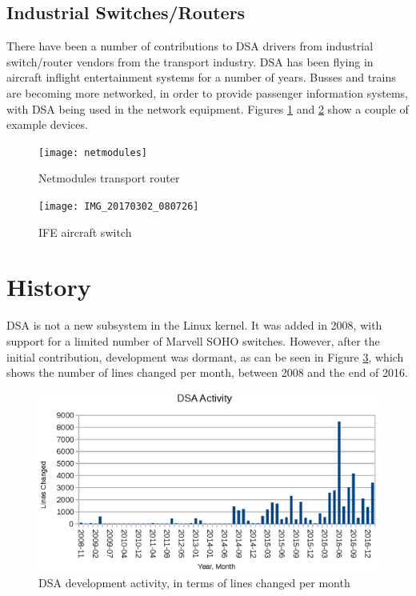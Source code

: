 \documentclass[letterpaper]{article}
\begin{document}
\subsection{Industrial Switches/Routers}

There have been a number of contributions to DSA drivers from
industrial switch/router vendors from the transport industry. DSA has
been flying in aircraft inflight entertainment systems for a number of
years. Busses and trains are becoming more networked, in order to
provide passenger information systems, with DSA being used in the
network equipment. Figures \ref{netmodules} and \ref{ife} show a
couple of example devices.

\begin{figure}[ht]
  \centering
  \texttt{[image: netmodules]}
  \caption{Netmodules transport router}
  \label{netmodules}
\end{figure}

\begin{figure}[ht]
  \centering
  \texttt{[image: IMG\_20170302\_080726]}
  \caption{IFE aircraft switch}
  \label{ife}
\end{figure}

\section{History}

DSA is not a new subsystem in the Linux kernel. It was added in 2008,
with support for a limited number of Marvell SOHO switches. However,
after the initial contribution, development was dormant, as can be
seen in Figure \ref{dsa-activity}, which shows the number of lines
changed per month, between 2008 and the end of 2016.

\begin{figure}[ht]
  \centering
  \includegraphics[width=\columnwidth]{dsa-activity}
  \caption{DSA development activity, in terms of lines changed per
    month}
  \label{dsa-activity}
\end{figure}
\end{document}

